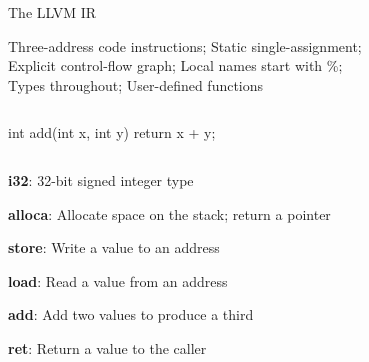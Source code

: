 \documentclass{plt}
\begin{document}
\begin{frame}[fragile=singleslide]{The LLVM IR}

  Three-address code instructions; Static single-assignment; \\
  Explicit control-flow graph; Local names start with \%; \\ Types
  throughout; User-defined functions

\begin{columns}
\begin{column}{0.4\textwidth}
\begin{C}
int add(int x, int y)
{
  return x + y;
}
\end{C}
\end{column}
\begin{column}{0.6\textwidth}
\end{column}
\end{columns}

\parskip=0pt

\textbf{i32}: 32-bit signed integer type

\textbf{alloca}: Allocate space on the stack; return a pointer

\textbf{store}: Write a value to an address

\textbf{load}: Read a value from an address

\textbf{add}: Add two values to produce a third

\textbf{ret}: Return a value to the caller

\end{frame}
\end{document}
